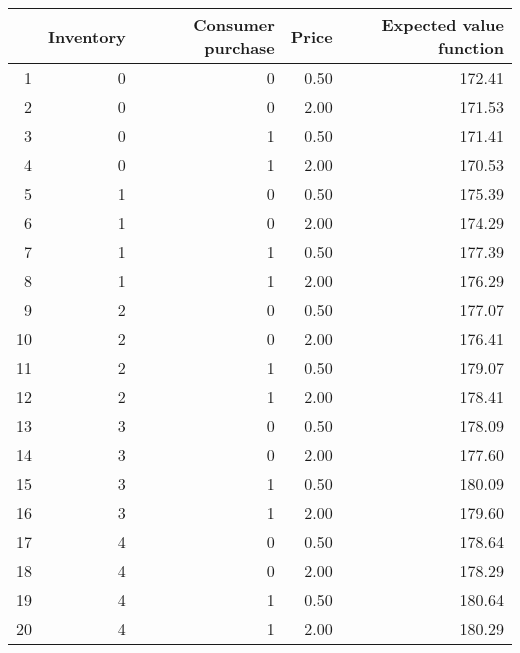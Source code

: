 \begin{tabular}{rrrrr}
  \hline
 & Inventory & Consumer purchase & Price & Expected value function \\ 
  \hline
1 &   0 &   0 & 0.50 & 172.41 \\ 
  2 &   0 &   0 & 2.00 & 171.53 \\ 
  3 &   0 &   1 & 0.50 & 171.41 \\ 
  4 &   0 &   1 & 2.00 & 170.53 \\ 
  5 &   1 &   0 & 0.50 & 175.39 \\ 
  6 &   1 &   0 & 2.00 & 174.29 \\ 
  7 &   1 &   1 & 0.50 & 177.39 \\ 
  8 &   1 &   1 & 2.00 & 176.29 \\ 
  9 &   2 &   0 & 0.50 & 177.07 \\ 
  10 &   2 &   0 & 2.00 & 176.41 \\ 
  11 &   2 &   1 & 0.50 & 179.07 \\ 
  12 &   2 &   1 & 2.00 & 178.41 \\ 
  13 &   3 &   0 & 0.50 & 178.09 \\ 
  14 &   3 &   0 & 2.00 & 177.60 \\ 
  15 &   3 &   1 & 0.50 & 180.09 \\ 
  16 &   3 &   1 & 2.00 & 179.60 \\ 
  17 &   4 &   0 & 0.50 & 178.64 \\ 
  18 &   4 &   0 & 2.00 & 178.29 \\ 
  19 &   4 &   1 & 0.50 & 180.64 \\ 
  20 &   4 &   1 & 2.00 & 180.29 \\ 
   \hline
\end{tabular}
